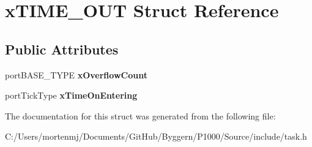 \hypertarget{structx_t_i_m_e___o_u_t}{\section{x\-T\-I\-M\-E\-\_\-\-O\-U\-T Struct Reference}
\label{structx_t_i_m_e___o_u_t}
}
\subsection*{Public Attributes}
\begin{DoxyCompactItemize}
\item 
\hypertarget{structx_t_i_m_e___o_u_t_ac04daff481f3ee5f08228b09a83a678b}{port\-B\-A\-S\-E\-\_\-\-T\-Y\-P\-E {\bfseries x\-Overflow\-Count}}\label{structx_t_i_m_e___o_u_t_ac04daff481f3ee5f08228b09a83a678b}

\item 
\hypertarget{structx_t_i_m_e___o_u_t_a8342bf2057b33c50205da6a19d9caa1c}{port\-Tick\-Type {\bfseries x\-Time\-On\-Entering}}\label{structx_t_i_m_e___o_u_t_a8342bf2057b33c50205da6a19d9caa1c}

\end{DoxyCompactItemize}


The documentation for this struct was generated from the following file\-:\begin{DoxyCompactItemize}
\item 
C\-:/\-Users/mortenmj/\-Documents/\-Git\-Hub/\-Byggern/\-P1000/\-Source/include/task.\-h\end{DoxyCompactItemize}
